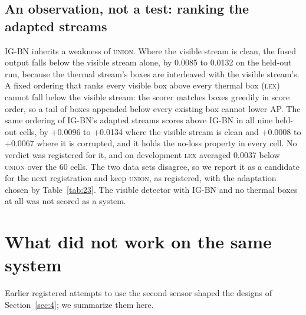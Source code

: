 \documentclass[journal]{IEEEtran}
\begin{document}
\subsection{An observation, not a test: ranking the adapted streams}\label{sec:5.4}
\mbox{IG-BN} inherits a weakness of \textsc{union}. Where the visible stream is clean, the fused output falls below the visible stream alone, by 0.0085 to 0.0132 on the held-out run, because the thermal stream's boxes are interleaved with the visible stream's. A fixed ordering that ranks every visible box above every thermal box (\textsc{lex}) cannot fall below the visible stream: the scorer matches boxes greedily in score order, so a tail of boxes appended below every existing box cannot lower AP. The same ordering of \mbox{IG-BN}'s adapted streams scores above \mbox{IG-BN} in all nine held-out cells, by +0.0096 to +0.0134 where the visible stream is clean and +0.0008 to +0.0067 where it is corrupted, and it holds the no-loss property in every cell. No verdict was registered for it, and on development \textsc{lex} averaged 0.0037 below \textsc{union} over the 60 cells. The two data sets disagree, so we report it as a candidate for the next registration and keep \textsc{union}, as registered, with the adaptation chosen by Table~\ref{tab:23}. The visible detector with \mbox{IG-BN} and no thermal boxes at all was not scored as a system.

\section{What did not work on the same system}\label{sec:6}
Earlier registered attempts to use the second sensor shaped the designs of Section~\ref{sec:4}; we summarize them here.
\end{document}
